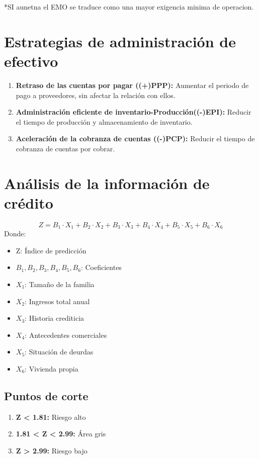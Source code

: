 \documentclass{templateNote}
\begin{document}
*SI aunetna el EMO se traduce como una mayor exigencia minima de operacion.
\section{Estrategias de administración de efectivo}
\begin{enumerate}
    \item \textbf{Retraso de las cuentas por pagar ((+)PPP):} Aumentar el periodo de pago a proveedores, sin afectar la relación con ellos.
    \item \textbf{Administración eficiente de inventario-Producción((-)EPI):} Reducir el tiempo de producción y almacenamiento de inventario.
    \item \textbf{Aceleración de la cobranza de cuentas ((-)PCP):} Reducir el tiempo de cobranza de cuentas por cobrar.
\end{enumerate}

\newpage
\section{Análisis de la información de crédito}
\begin{equation*}
    Z = B_1 \cdot X_1 + B_2 \cdot X_2 + B_3 \cdot X_3 + B_4 \cdot X_4 + B_5 \cdot X_5 + B_6 \cdot X_6
\end{equation*}
Donde:
\begin{itemize}
    \item Z: Índice de predicción
    \item $B_1, B_2, B_3, B_4, B_5, B_6$: Coeficientes
    \item $X_1$: Tamaño de la familia
    \item $X_2$: Ingresos total anual
    \item $X_3$: Historia crediticia
    \item $X_4$: Antecedentes comerciales
    \item $X_5$: Situación de deurdas
    \item $X_6$: Vivienda propia
\end{itemize}

\subsection{Puntos de corte}
\begin{enumerate}
    \item \textbf{Z < 1.81:} Riesgo alto
    \item \textbf{1.81 < Z < 2.99:} Área gris
    \item \textbf{Z > 2.99:} Riesgo bajo
\end{enumerate}
\end{document}
